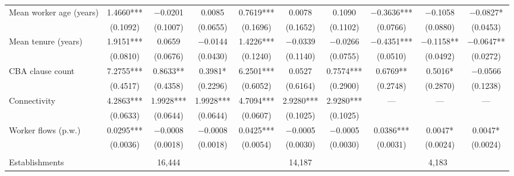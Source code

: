 \begin{table}[H]
\begin{threeparttable}
{\begin{tabular}{lccccccccc}
Mean worker age (years) & 1.4660*** & $-$0.0201 & 0.0085 & 0.7619*** & 0.0078 & 0.1090 & $-$0.3636*** & $-$0.1058 & $-$0.0827* \\
 & (0.1092) & (0.1007) & (0.0655) & (0.1696) & (0.1652) & (0.1102) & (0.0766) & (0.0880) & (0.0453) \\
Mean tenure (years) & 1.9151*** & 0.0659 & $-$0.0144 & 1.4226*** & $-$0.0339 & $-$0.0266 & $-$0.4351*** & $-$0.1158** & $-$0.0647** \\
 & (0.0810) & (0.0676) & (0.0430) & (0.1240) & (0.1140) & (0.0755) & (0.0510) & (0.0492) & (0.0272) \\
CBA clause count & 7.2755*** & 0.8633** & 0.3981* & 6.2501*** & 0.0527 & 0.7574*** & 0.6769** & 0.5016* & $-$0.0566 \\
 & (0.4517) & (0.4358) & (0.2296) & (0.6052) & (0.6164) & (0.2900) & (0.2748) & (0.2870) & (0.1238) \\
Connectivity & 4.2863*** & 1.9928*** & 1.9928*** & 4.7094*** & 2.9280*** & 2.9280*** & --- & --- & --- \\
 & (0.0633) & (0.0644) & (0.0644) & (0.0607) & (0.1025) & (0.1025) &  &  &  \\
Worker flows (p.w.) & 0.0295*** & $-$0.0008 & $-$0.0008 & 0.0425*** & $-$0.0005 & $-$0.0005 & 0.0386*** & 0.0047* & 0.0047* \\
 & (0.0036) & (0.0018) & (0.0018) & (0.0054) & (0.0030) & (0.0030) & (0.0031) & (0.0024) & (0.0024) \\
 &  &  &  &  &  &  &  &  &  \\
\midrule
Establishments & \multicolumn{3}{c}{16{,}444} & \multicolumn{3}{c}{14{,}187} & \multicolumn{3}{c}{4{,}183} \\
\bottomrule
\end{tabular}}
\scriptsize
\begin{tablenotes}

\end{tablenotes}
\end{threeparttable}
\end{table}
